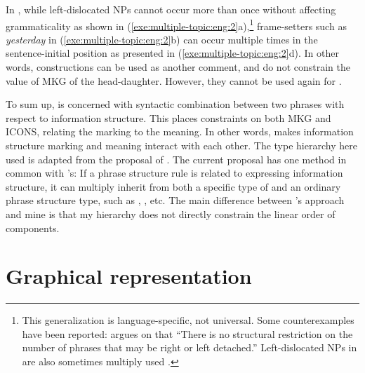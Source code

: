 In , while left-dislocated NPs cannot occur more than
once without affecting grammaticality as shown in
(\ref{exe:multiple-topic:eng:2}a),\footnote{This generalization is
  language-specific, not universal.  Some counterexamples have been
  reported: \citet[123]{vallduvi:93} argues on  that
  ``There is no structural restriction on the number of phrases that
  may be right or left detached.''  Left-dislocated NPs in
   are also sometimes multiply used
  \citep[224]{zagona:02}.}  frame-setters such as
\textit{yesterday} in (\ref{exe:multiple-topic:eng:2}b) can occur
multiple times in the sentence-initial position as presented in
(\ref{exe:multiple-topic:eng:2}d). In other words,
 constructions can be used as another comment, and
do not constrain the value of MKG of the head-daughter.
However, they cannot be used again for .

 



To sum up,  is concerned with
syntactic combination between two phrases with respect to information
structure.  This places constraints on both MKG and ICONS, relating
the marking to the meaning. In other words,  makes
information structure marking and meaning interact with each other.
The type hierarchy here used is adapted from the proposal of
\citet{paggio:09}. The current proposal has one method in common with
\citeauthor{paggio:09}'s: If a phrase structure rule is related to
expressing information structure, it can multiply inherit from both a
specific type of  and an ordinary phrase structure type,
such as , , etc. The main
difference between \citeauthor{paggio:09}'s approach and mine is that
my  hierarchy does not directly constrain the linear order
of components.



\section{Graphical representation}
\label{9:sec:graph}


